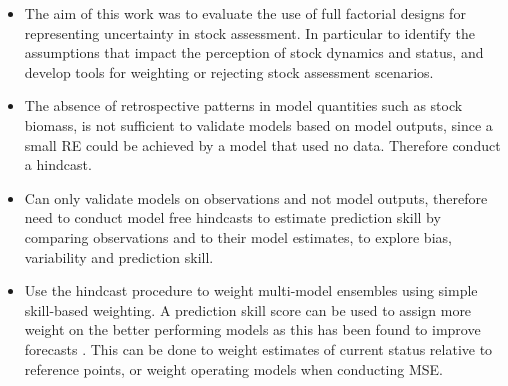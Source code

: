 \begin{itemize}
    \item The aim of this work was to evaluate the use of full factorial designs for representing uncertainty in stock assessment. In particular to identify the assumptions that impact the perception of stock dynamics and status, and develop tools for weighting or rejecting stock assessment scenarios.
  

    
    \item The absence of retrospective patterns in model quantities such as stock biomass, is not sufficient to validate models based on model outputs, since a small RE could be achieved by a model that used no data.  Therefore conduct a hindcast.
    
    \item Can only validate models on observations and not model outputs, therefore need to conduct model free hindcasts to estimate prediction skill by comparing observations and to their model estimates, to explore bias, variability and prediction skill.
    
    \item Use the hindcast procedure to weight multi-model ensembles using simple skill-based weighting. A prediction skill score can be used to assign more weight on the better performing models as this has been found to improve forecasts \citep[e.g.][]{casanova2009weighting}. This can be done to weight estimates of current status relative to reference points, or weight operating models when conducting MSE. %



\end{itemize}

